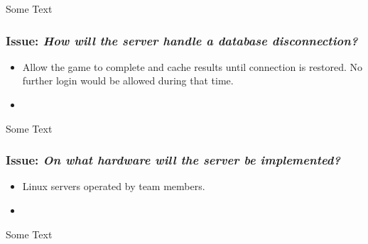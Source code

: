 Some Text

\subsubsection*{Issue: \textit{How will the server handle a database disconnection?}}

  \begin{itemize}
    \item Allow the game to complete and cache results until connection is restored. No further login would be allowed during that time.
    \item 
  \end{itemize}

Some Text

\subsubsection*{Issue: \textit{On what hardware will the server be implemented?}}

  \begin{itemize}
    \item Linux servers operated by team members.
    \item 
  \end{itemize}

Some Text

